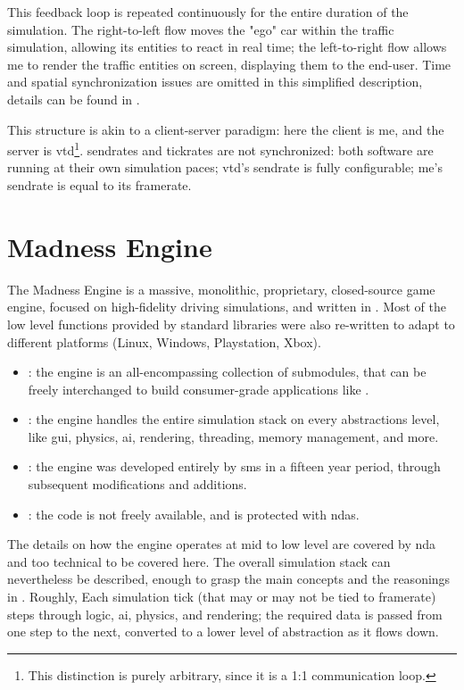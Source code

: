 This feedback loop is repeated continuously for the entire duration of the simulation. The right-to-left flow moves the "ego" car within the traffic simulation, allowing its entities to react in real time; the left-to-right flow allows \gls{me} to render the traffic entities on screen, displaying them to the end-user. Time and spatial synchronization issues are omitted in this simplified description, details can be found in . %

This structure is akin to a client-server paradigm: here the client is \gls{me}, and the server is \gls{vtd}\footnote{This distinction is purely arbitrary, since it is a 1:1 communication loop.}. \Glspl{sendrate} and \glspl{tickrate} are not synchronized: both software are running at their own simulation paces; \gls{vtd}'s \gls{sendrate} is fully configurable; \gls{me}'s \gls{sendrate} is equal to its framerate.

\section{Madness Engine}\label{sc:software:madnessengine}

The Madness Engine is a massive, monolithic, proprietary, closed-source game engine, focused on high-fidelity driving simulations, and written in . Most of the low level functions provided by standard libraries were also re-written to adapt to different platforms (Linux, Windows, Playstation, Xbox).

\begin{itemize}
	\item {}: the engine is an all-encompassing collection of submodules, that can be freely interchanged to build consumer-grade applications like .
	\item {}: the engine handles the entire simulation stack on every abstractions level, like \gls{gui}, physics, \gls{ai}, rendering, threading, memory management, and more.
	\item {}: the engine was developed entirely by \gls{sms} in a fifteen year period, through subsequent modifications and additions.
	\item {}: the code is not freely available, and is protected with \glspl{nda}.
\end{itemize}

The details on how the engine operates at mid to low level are covered by \gls{nda} and too technical to be covered here. The overall simulation stack can nevertheless be described, enough to grasp the main concepts and the reasonings in . Roughly, Each simulation tick (that may or may not be tied to framerate) steps through logic, \gls{ai}, physics, and rendering; the required data is passed from one step to the next, converted to a lower level of abstraction as it flows down.

